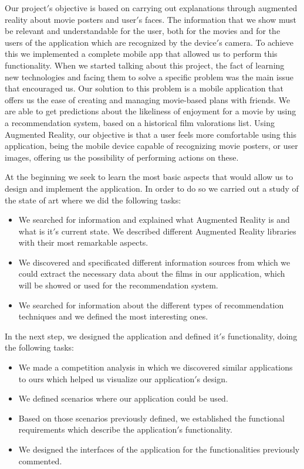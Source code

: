Our project$'$s objective is based on carrying out explanations through augmented reality about movie posters and user$'$s faces. 
The information that we show must be relevant and understandable for the user, both for the movies and for the users of the application which are
recognized by the device$'$s camera. To achieve this we implemented a complete mobile app that allowed us to perform this functionality.
When we started talking about this project, the fact of learning new technologies and facing them
to solve a specific problem was the main issue that encouraged us. 
Our solution to this problem is a mobile application that offers us the ease of 
creating and managing movie-based plans with friends. We are able to get predictions 
about the likeliness of enjoyment for a movie by using a recommendation system, based on 
a historical film valorations list. Using Augmented Reality, our objective is that a 
user feels more comfortable using this application, being the mobile device capable of recognizing 
movie posters, or user images, offering us the possibility of performing actions on these.

At the beginning we seek to learn the most basic aspects that would allow us to design
and implement the application. In order to do so we carried out a study of the state of art where we did the following tasks:
\begin{itemize}  
    \item We searched for information and explained what Augmented Reality is and what is it$'$s current state. We described different
     Augmented Reality libraries with their most remarkable aspects.
    \item We discovered and specificated different information sources from which we could extract the necessary data about the films in our application, which will be showed or used for the recommendation system.
    \item We searched for information about the different types of recommendation techniques and we defined the most interesting ones.
\end{itemize}

In the next step, we designed the application and defined it$'$s functionality, doing the following tasks:
\begin{itemize}
    \item We made a competition analysis in which we discovered similar applications to ours which helped us visualize our application$'$s design.
    \item We defined scenarios where our application could be used.
    \item Based on those scenarios previously defined, we established the functional requirements which describe the application$'$s functionality.
    \item We designed the interfaces of the application for the functionalities previously commented.
\end{itemize}

